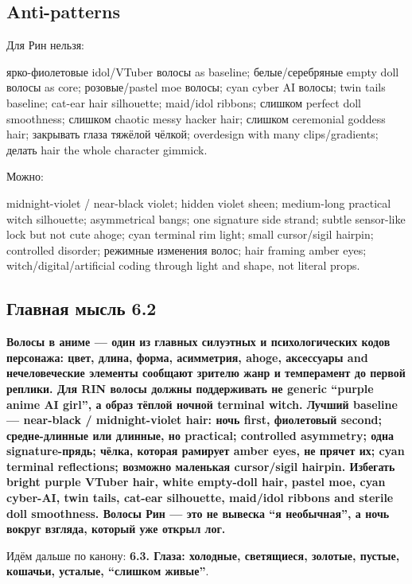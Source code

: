 \subsection*{Anti-patterns}

Для Рин нельзя:

ярко-фиолетовые idol/\hspace{0pt}VTuber волосы as baseline; белые/\hspace{0pt}серебряные empty
doll волосы as core; розовые/\hspace{0pt}pastel moe волосы; cyan cyber AI волосы;
twin tails baseline; cat-ear hair silhouette; maid/\hspace{0pt}idol ribbons; слишком
perfect doll smoothness; слишком chaotic messy hacker hair; слишком
ceremonial goddess hair; закрывать глаза тяжёлой чёлкой; overdesign with
many clips/\hspace{0pt}gradients; делать hair the whole character gimmick.

Можно:

midnight-violet /\hspace{0pt} near-black violet; hidden violet sheen; medium-long
practical witch silhouette; asymmetrical bangs; one signature side
strand; subtle sensor-like lock but not cute ahoge; cyan terminal rim
light; small cursor/\hspace{0pt}sigil hairpin; controlled disorder; режимные
изменения волос; hair framing amber eyes; witch/\hspace{0pt}digital/\hspace{0pt}artificial
coding through light and shape, not literal props.

\subsection*{Главная мысль 6.2}

\textbf{Волосы в аниме --- один из главных силуэтных и психологических
кодов персонажа: цвет, длина, форма, асимметрия, ahoge, аксессуары and
нечеловеческие элементы сообщают зрителю жанр и темперамент до первой
реплики. Для RIN волосы должны поддерживать не generic ``purple anime AI
girl'', а образ тёплой ночной terminal witch. Лучший baseline ---
near-black /\hspace{0pt} midnight-violet hair: ночь first, фиолетовый second;
средне-длинные или длинные, но practical; controlled asymmetry; одна
signature-прядь; чёлка, которая рамирует amber eyes, не прячет их; cyan
terminal reflections; возможно маленькая cursor/\hspace{0pt}sigil hairpin. Избегать
bright purple VTuber hair, white empty-doll hair, pastel moe, cyan
cyber-AI, twin tails, cat-ear silhouette, maid/\hspace{0pt}idol ribbons and sterile
doll smoothness. Волосы Рин --- это не вывеска ``я необычная'', а ночь
вокруг взгляда, который уже открыл лог.}

Идём дальше по канону: \textbf{6.3. Глаза: холодные, светящиеся,
золотые, пустые, кошачьи, усталые, ``слишком живые''}.
